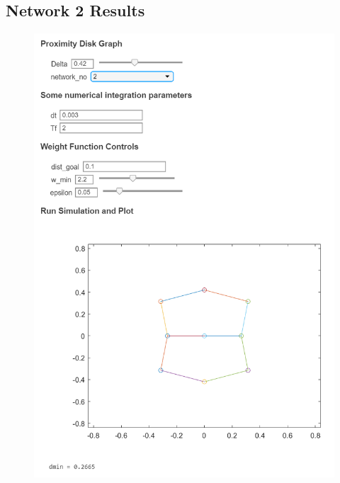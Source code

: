 \documentclass[]{article}
\numberwithin{equation}{section}
\begin{document}
\subsection{Network 2 Results}
\begin{figure}[h]
    \centering
    \includegraphics[height = 0.75 \textheight]{figs/pblm6_network2.png}
\end{figure}


\newpage
\end{document}
